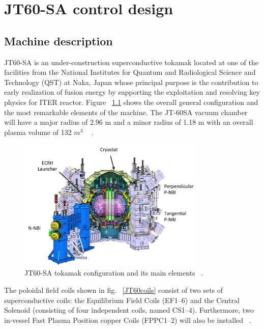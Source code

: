 \chapter{JT60-SA control design}

\section{Machine description}

JT60-SA is an under-construction superconductive tokamak located at one of the facilities from the National Institutes for Quantum and Radiological Science and Technology (QST)  at  Naka, Japan whose principal purpose is  the contribution to early realization of fusion energy by supporting the exploitation and resolving key physics for ITER reactor. Figure ~\ref{JT60schm} shows the overall general configuration and the most remarkable elements of the machine. The JT-60SA  vacuum chamber will have a major radius of 2.96 m and a minor radius of 1.18 m with an overall plasma volume of 132 $m^3$ ~\cite{Spears2014} .
\smallskip
\begin{figure}
	\centering
	\includegraphics[width=0.80\textwidth]{Chp3/JT60SA.png}
	
	\caption{\label{JT60schm}JT60-SA tokamak configuration and its main elements ~\cite{JT60SA:ResearchPlan}.}
\end{figure}

The poloidal field coils shown in fig. ~\ref{JT60coils} consist of two sets of superconductive coils: the Equilibrium Field Coils (EF1–6) and the Central Solenoid (consisting of four independent coils, named CS1–4). Furthermore, two in-vessel Fast Plasma Position copper Coils (FPPC1–2) will also be installed ~\cite{NCruz}.
\smallskip

